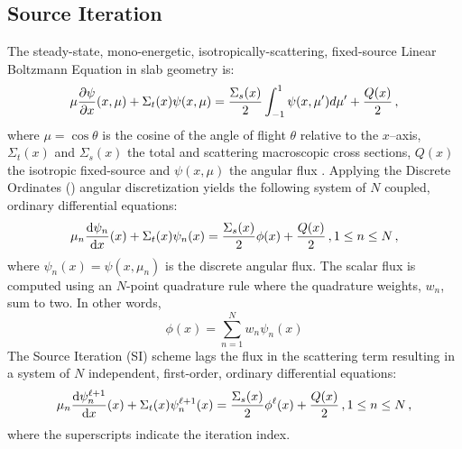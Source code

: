 
\subsection{Source Iteration}
The steady-state, mono-energetic, isotropically-scattering, fixed-source Linear Boltzmann Equation in slab geometry is: 
	\begin{equation} \label{eq:bte}
		\mu \frac{\partial \psi}{\partial x}(x, \mu) + \Sigma_t(x) \psi(x,\mu) = 
		\frac{\Sigma_s(x)}{2} \int_{-1}^{1} \psi(x, \mu') d\mu' + \frac{Q(x)}{2} \,,
	\end{equation}
where $\mu = \cos\theta$ is the cosine of the angle of flight $\theta$ relative to the $x$--axis, $\Sigma_t(x)$ and $\Sigma_s(x)$ the total and scattering macroscopic cross sections, $Q(x)$ the isotropic fixed-source and $\psi(x, \mu)$ the angular flux \cite{adams}. Applying the Discrete Ordinates (\SN) angular discretization yields the following system of $N$ coupled, ordinary differential equations: 
	\begin{equation} \label{eq:sn}
		\mu_n \frac{\mathop{}\!\mathrm{d} \psi_n}{\mathop{}\!\mathrm{d} x}(x) + \Sigma_t(x) \psi_n(x) = 
		\frac{\Sigma_s(x)}{2} \phi(x) + \frac{Q(x)}{2} \,, 1 \leq n \leq N \,,
	\end{equation}
where $\psi_n(x) = \psi(x, \mu_n)$ is the discrete angular flux. The scalar flux is computed using an $N$-point quadrature rule where the quadrature weights, $w_n$, sum to two. In other words, 
	\begin{equation} 
		\phi(x) = \sum_{n=1}^N w_n \psi_n(x)
	\end{equation}
The Source Iteration (SI) scheme lags the flux in the scattering term resulting in a system of $N$ independent, first-order, ordinary differential equations: 
	\begin{equation} \label{eq:si}
			\mu_n \frac{\mathop{}\!\mathrm{d} \psi_n^{\ell+1}}{\mathop{}\!\mathrm{d} x}(x) + \Sigma_t(x) \psi_n^{\ell+1}(x) = 
			\frac{\Sigma_s(x)}{2} \phi^{\ell}(x) + \frac{Q(x)}{2} \,, 1 \leq n \leq N \,,
		\end{equation}
where the superscripts indicate the iteration index. 

